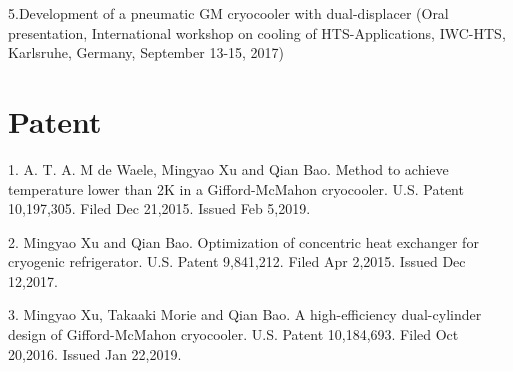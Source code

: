 \documentclass[letterpaper,11pt]{article}
\begin{document}
5.Development of a pneumatic GM cryocooler with dual-displacer (Oral presentation, International workshop on cooling of HTS-Applications, IWC-HTS, Karlsruhe, Germany, September 13-15, 2017)

\section{Patent}
1. A. T. A. M de Waele, Mingyao Xu and Qian Bao. Method to achieve temperature lower than 2K in a Gifford-McMahon cryocooler. U.S. Patent 10,197,305. Filed Dec 21,2015. Issued Feb 5,2019.

2. Mingyao Xu and Qian Bao. Optimization of concentric heat exchanger for cryogenic refrigerator. U.S. Patent 9,841,212. Filed Apr 2,2015. Issued Dec 12,2017.

3. Mingyao Xu, Takaaki Morie and Qian Bao. A high-efficiency dual-cylinder design of Gifford-McMahon cryocooler. U.S. Patent 10,184,693. Filed Oct 20,2016. Issued Jan 22,2019.
\end{document}

